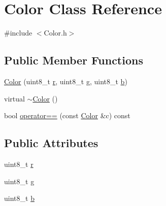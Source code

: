 \hypertarget{class_color}{}\section{Color Class Reference}
\label{class_color}


{\ttfamily \#include $<$Color.\+h$>$}

\subsection*{Public Member Functions}
\begin{DoxyCompactItemize}
\item 
\hyperlink{class_color_a1f7b98292d4ef430356291d275323f23}{Color} (uint8\+\_\+t \hyperlink{class_color_aecbc1a4121c21990512e7c10544d6ece}{r}, uint8\+\_\+t \hyperlink{class_color_a23331f00b02491a901873b5085461d99}{g}, uint8\+\_\+t \hyperlink{class_color_a78ede410fb277ade36fbb157f0235d6f}{b})
\item 
virtual \hyperlink{class_color_a216db785c83aa61b466d290ec363917a}{$\sim$\+Color} ()
\item 
bool \hyperlink{class_color_a1373e891e072884e7a4a496da2e8abb8}{operator==} (const \hyperlink{class_color}{Color} \&c) const 
\end{DoxyCompactItemize}
\subsection*{Public Attributes}
\begin{DoxyCompactItemize}
\item 
uint8\+\_\+t \hyperlink{class_color_aecbc1a4121c21990512e7c10544d6ece}{r}
\item 
uint8\+\_\+t \hyperlink{class_color_a23331f00b02491a901873b5085461d99}{g}
\item 
uint8\+\_\+t \hyperlink{class_color_a78ede410fb277ade36fbb157f0235d6f}{b}
\end{DoxyCompactItemize}
